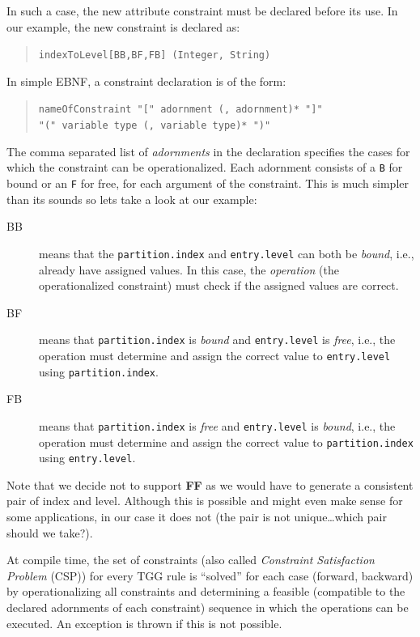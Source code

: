 In such a case, the new attribute constraint must be declared before its use. 
In our example, the new constraint is declared as:
\begin{quote}
 \texttt{indexToLevel[BB,BF,FB] (Integer, String)}
\end{quote} 
In simple EBNF, a constraint declaration is of the form:
\begin{quote}
\texttt{nameOfConstraint "[" adornment (, adornment)* "]"}\\
\texttt{"(" variable type (, variable type)* ")"}
\end{quote}
The comma separated list of \emph{adornments} in the declaration specifies the cases for which the constraint can be operationalized.
Each adornment consists of a \texttt{B} for bound or an \texttt{F} for free, for each argument of the constraint.
This is much simpler than its sounds so lets take a look at our example:
\begin{description}
\item[BB] means that the \texttt{partition.index} and \texttt{entry.level} can both be \emph{bound}, i.e., already have assigned values.
In this case, the \emph{operation} (the operationalized constraint) must check if the assigned values are correct. 
\item[BF] means that \texttt{partition.index} is \emph{bound} and \texttt{entry.level} is \emph{free}, i.e., the operation must determine and assign the correct value to \texttt{entry.level} using \texttt{partition.index}.
\item[FB] means that \texttt{partition.index} is \emph{free} and \texttt{entry.level} is \emph{bound}, i.e., the operation must determine and assign the correct value to \texttt{parti\-tion.in\-dex} using \texttt{entry.level}. 
\end{description}

Note that we decide not to support \textbf{FF} as we would have to generate a consistent pair of index and level.
Although this is possible and might even make sense for some applications, in our case it does not (the pair is not unique\ldots which pair should we take?).

At compile time, the set of constraints (also called \emph{Constraint Satisfaction Problem} (CSP)) for every TGG rule is ``solved'' for each case (forward, backward) by operationalizing all constraints and determining a feasible (compatible to the declared adornments of each constraint) sequence in which the operations can be executed.
An exception is thrown if this is not possible.
